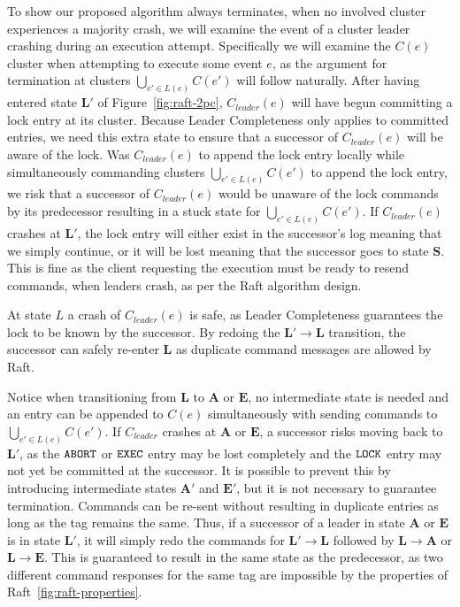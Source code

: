 \documentclass{article}
\begin{document}
	To show our proposed algorithm always terminates, when no involved cluster experiences a majority crash, we will examine the event of a cluster leader crashing during an execution attempt.
	Specifically we will examine the $C(e)$ cluster when attempting to execute some event $e$, as the argument for termination at clusters $\bigcup_{e' \in L(e)} C(e')$ will follow naturally.
	After having entered state $\bm{L}'$ of Figure~\ref{fig:raft-2pc}, $C_{leader}(e)$ will have begun committing a lock entry at its cluster.
	Because Leader Completeness only applies to committed entries, we need this extra state to ensure that a successor of $C_{leader}(e)$ will be aware of the lock.
	Was $C_{leader}(e)$ to append the lock entry locally while simultaneously commanding clusters $\bigcup_{e' \in L(e)} C(e')$ to append the lock entry, we risk that a successor of $C_{leader}(e)$ would be unaware of the lock commands by its predecessor resulting in a stuck state for $\bigcup_{e' \in L(e)} C(e')$.
	If $C_{leader}(e)$ crashes at $\bm{L}'$, the lock entry will either exist in the successor's log meaning that we simply continue, or it will be lost meaning that the successor goes to state $\bm{S}$.
	This is fine as the client requesting the execution must be ready to resend commands, when leaders crash, as per the Raft algorithm design.

	At state $L$ a crash of $C_{leader}(e)$ is safe, as Leader Completeness guarantees the lock to be known by the successor.
	By redoing the $\bm{L}' \rightarrow \bm{L}$ transition, the successor can safely re-enter $\bm{L}$ as duplicate command messages are allowed by Raft.

	Notice when transitioning from $\bm{L}$ to $\bm{A}$ or $\bm{E}$, no intermediate state is needed and an entry can be appended to $C(e)$ simultaneously with sending commands to $\bigcup_{e' \in L(e)} C(e')$.
	If $C_{leader}$ crashes at $\bm{A}$ or $\bm{E}$, a successor risks moving back to $\bm{L}'$, as the $\texttt{ABORT}$ or $\texttt{EXEC}$ entry may be lost completely and the $\texttt{LOCK}$ entry may not yet be committed at the successor.
	It is possible to prevent this by introducing intermediate states $\bm{A}'$ and $\bm{E}'$, but it is not necessary to guarantee termination.
	Commands can be re-sent without resulting in duplicate entries as long as the tag remains the same.
	Thus, if a successor of a leader in state $\bm{A}$ or $\bm{E}$ is in state $\bm{L}'$, it will simply redo the commands for $\bm{L'} \rightarrow \bm{L}$ followed by $\bm{L} \rightarrow \bm{A}$ or $\bm{L} \rightarrow \bm{E}$.
	This is guaranteed to result in the same state as the predecessor, as two different command responses for the same tag are impossible by the properties of Raft~\ref{fig:raft-properties}.
\end{document}
